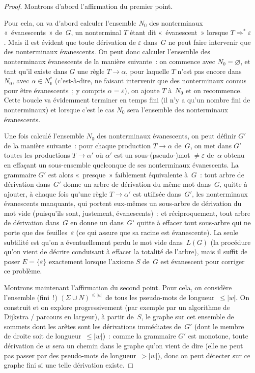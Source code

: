 \documentclass[12pt,a4paper]{article}
\theoremstyle{definition}
\begin{document}
\begin{proof}
Montrons d'abord l'affirmation du premier point.

Pour cela, on va d'abord calculer l'ensemble $N_0$ des nonterminaux
« évanescents » de $G$, un nonterminal $T$ étant dit « évanescent »
lorsque $T \mathrel{\Rightarrow^*} \varepsilon$.  Mais il est évident
que toute dérivation de $\varepsilon$ dans $G$ ne peut faire
intervenir que des nonterminaux évanescents.  On peut donc calculer
l'ensemble des nonterminaux évanescents de la manière suivante : on
commence avec $N_0 = \varnothing$, et tant qu'il existe dans $G$ une
règle $T \rightarrow \alpha$, pour laquelle $T$ n'est pas encore
dans $N_0$, avec $\alpha \in N_0^*$ (c'est-à-dire, ne faisant
intervenir que des nonterminaux connus pour être évanescents ; y
compris $\alpha = \varepsilon$), on ajoute $T$ à $N_0$ et on
recommence.  Cette boucle va évidemment terminer en temps fini (il n'y
a qu'un nombre fini de nonterminaux) et lorsque c'est le cas $N_0$
sera l'ensemble des nonterminaux évanescents.

Une fois calculé l'ensemble $N_0$ des nonterminaux évanescents, on
peut définir $G'$ de la manière suivante : pour chaque production $T
\rightarrow \alpha$ de $G$, on met dans $G'$ toutes les productions $T
\rightarrow \alpha'$ où $\alpha'$ est un sous-(pseudo-)mot
$\neq\varepsilon$ de $\alpha$ obtenu en effaçant un sous-ensemble
quelconque de ses nonterminaux évanescents.  La grammaire $G'$ est
alors « presque » faiblement équivalente à $G$ : tout arbre de
dérivation dans $G'$ donne un arbre de dérivation du même mot
dans $G$, quitte à ajouter, à chaque fois qu'une règle $T \rightarrow
\alpha'$ est utilisée dans $G'$, les nonterminaux évanescents
manquants, qui portent eux-mêmes un sous-arbre de dérivation du mot
vide (puisqu'ils sont, justement, évanescents) ; et réciproquement,
tout arbre de dérivation dans $G$ en donne un dans $G'$ quitte à
effacer tout sous-arbre qui ne porte que des feuilles $\varepsilon$
(ce qui assure que sa racine est évanescente).  La seule subtilité est
qu'on a éventuellement perdu le mot vide dans $L(G)$ (la procédure
qu'on vient de décrire conduisant à effacer la totalité de l'arbre),
mais il suffit de poser $E = \{\varepsilon\}$ exactement lorsque
l'axiome $S$ de $G$ est évanescent pour corriger ce problème.

Montrons maintenant l'affirmation du second point.  Pour cela, on
considère l'ensemble (fini !) $(\Sigma\cup N)^{\leq|w|}$ de tous les
pseudo-mots de longueur $\leq |w|$.  On construit et on explore
progressivement (par exemple par un algorithme de Dijkstra / parcours
en largeur), à partir de $S$, le graphe sur cet ensemble de sommets
dont les arêtes sont les dérivations immédiates de $G'$ (dont le
membre de droite soit de longueur $\leq |w|$) : comme la grammaire
$G'$ est monotone, toute dérivation de $w$ sera un chemin dans le
graphe qu'on vient de dire (elle ne peut pas passer par des
pseudo-mots de longueur $>|w|$), donc on peut détecter sur ce graphe
fini si une telle dérivation existe.
\end{proof}
\end{document}
